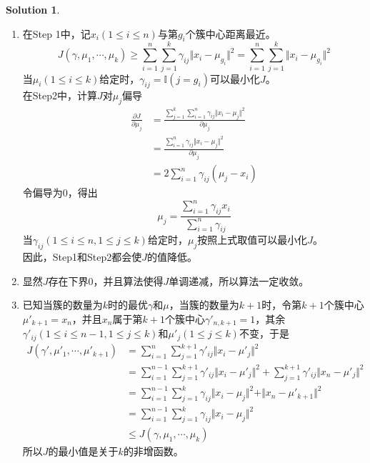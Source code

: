 \documentclass[a4paper,UTF8]{article}
\theoremstyle{definition}
\newtheorem*{solution}{Solution}
\begin{document}
\begin{solution}
	~\\
	\begin{enumerate}[(1)]
		\item 
		在Step 1中，记$x_i(1\leq i\leq n)$与第$g_i$个簇中心距离最近。
		\[
		J(\gamma,\mu_1,\cdots,\mu_k) \geq \sum_{i=1}^{n}\sum_{j=1}^{k}\gamma_{ij}\Vert x_i-\mu_{g_i} \Vert^2=\sum_{i=1}^{n}\sum_{j=1}^{k}\Vert x_i-\mu_{g_i} \Vert^2
		\]
		当$\mu_i(1\leq i\leq k)$给定时，$\gamma_{ij}=\mathbb{I}(j=g_i)$可以最小化$J$。\\
		在Step2中，计算$J$对$\mu_j$偏导
		\begin{align*}
		\frac{\partial J}{\partial \mu_j}
		&=\frac{\sum_{j=1}^{k}\sum_{i=1}^{n}\gamma_{ij}\Vert x_i-\mu_j \Vert^2}{\partial \mu_j}\\
		&=\frac{\sum_{i=1}^{n}\gamma_{ij}\Vert x_i-\mu_j \Vert^2}{\partial \mu_j}\\
		&=2\sum_{i=1}^n\gamma_{ij}(\mu_j-x_i)
		\end{align*}
		令偏导为0，得出
		\[\mu_j=\frac{\sum_{i=1}^n\gamma_{ij}x_i}{\sum_{i=1}^n\gamma_{ij}}\]
		当$\gamma_{ij}(1\leq i\leq n,1\leq j\leq k)$给定时，$\mu_j$按照上式取值可以最小化$J$。\\
		因此，Step1和Step2都会使$J$的值降低。
		
		\item 
		显然$J$存在下界0，并且算法使得$J$单调递减，所以算法一定收敛。
		
		\item 
		已知当簇的数量为$k$时的最优$\gamma$和$\mu$，当簇的数量为$k+1$时，令第$k+1$个簇中心$\mu'_{k+1}=x_n$，并且$x_n$属于第$k+1$个簇中心$\gamma'_{n,k+1}=1$，其余$\gamma'_{ij}(1\leq i\leq n-1,1\leq j\leq k)$和$\mu'_j(1\leq j\leq k)$不变，于是
		\begin{align*}
		J(\gamma',\mu'_1,\cdots,\mu'_{k+1})
		&=\sum_{i=1}^{n}\sum_{j=1}^{k+1}\gamma'_{ij}\Vert x_i-\mu'_j \Vert^2\\
		&=\sum_{i=1}^{n-1}\sum_{j=1}^{k+1}\gamma'_{ij}\Vert x_i-\mu'_j \Vert^2+\sum_{j=1}^{k+1}\gamma'_{ij}\Vert x_n-\mu'_j \Vert^2\\
		&=\sum_{i=1}^{n-1}\sum_{j=1}^{k}\gamma_{ij}\Vert x_i-\mu_j \Vert^2+\Vert x_n-\mu'_{k+1} \Vert^2\\
		&=\sum_{i=1}^{n-1}\sum_{j=1}^{k}\gamma_{ij}\Vert x_i-\mu_j \Vert^2\\
		&\leq J(\gamma,\mu_1,\cdots,\mu_k)
		\end{align*}
		所以$J$的最小值是关于$k$的非增函数。
		

\end{enumerate}
\end{solution}
\end{document}
